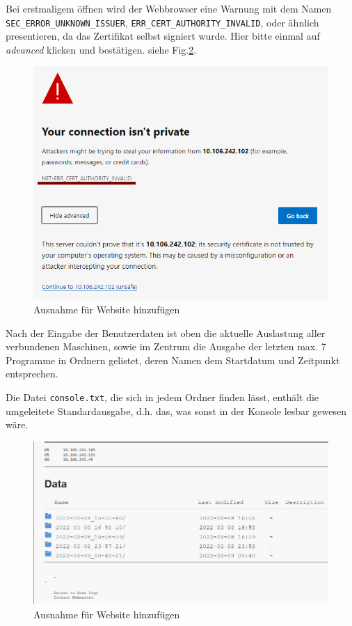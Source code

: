 \documentclass[11pt, a4paper]{article}
\begin{document}
Bei erstmaligem öffnen wird der Webbrowser eine Warnung mit dem Namen \texttt{SEC\_ERROR\_UNKNOWN\_ISSUER}, \texttt{ERR\_CERT\_AUTHORITY\_INVALID}, oder ähnlich presentieren, da das Zertifikat selbst signiert wurde.
Hier bitte einmal auf \emph{advanced} klicken und bestätigen.
siehe Fig.\ref{fig:web-1}.

\begin{figure}[h]
    \centering
    \includegraphics[width=0.7\linewidth]{./pics/2022-03-09_01-03_1.png}
    \caption{Ausnahme für Website hinzufügen}
    \label{fig:web-1}
\end{figure}

Nach der Eingabe der Benutzerdaten ist oben die aktuelle Auslastung aller verbundenen Maschinen, sowie im Zentrum die Ausgabe der letzten max. 7 Programme in Ordnern gelistet, deren Namen dem Startdatum und Zeitpunkt entsprechen.

Die Datei \texttt{console.txt}, die sich in jedem Ordner finden lässt, enthält die umgeleitete Standardausgabe, d.h. das, was sonst in der Konsole lesbar gewesen wäre.

\begin{figure}[h]
    \centering
    \includegraphics[width=0.7\linewidth]{./pics/2022-03-09_01-18.png}
    \caption{Ausnahme für Website hinzufügen}
    \label{fig:web-1}
\end{figure}
\end{document}
